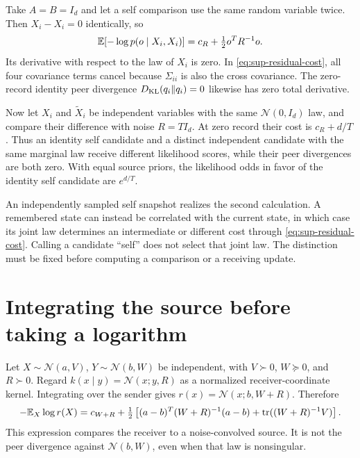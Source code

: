 Take $A=B=I_d$ and let a self comparison use the same random variable twice. Then $X_i-X_i=0$ identically, so
\begin{equation}
 \mathbb E[-\log p(o\mid X_i,X_i)]
 =c_R+\tfrac12o^TR^{-1}o.
 \label{eq:sup-self-cost}
\end{equation}
Its derivative with respect to the law of $X_i$ is zero. In \cref{eq:sup-residual-cost}, all four covariance terms cancel because $\Sigma_{ii}$ is also the cross covariance. The zero-record identity peer divergence $D_{\mathrm{KL}}(q_i\Vert q_i)=0$ likewise has zero total derivative.

Now let $X_i$ and $\widetilde X_i$ be independent variables with the same $\mathcal N(0,I_d)$ law, and compare their difference with noise $R=TI_d$. At zero record their cost is $c_R+d/T$. Thus an identity self candidate and a distinct independent candidate with the same marginal law receive different likelihood scores, while their peer divergences are both zero. With equal source priors, the likelihood odds in favor of the identity self candidate are $e^{d/T}$.

An independently sampled self snapshot realizes the second calculation. A remembered state can instead be correlated with the current state, in which case its joint law determines an intermediate or different cost through \cref{eq:sup-residual-cost}. Calling a candidate ``self'' does not select that joint law. The distinction must be fixed before computing a comparison or a receiving update.

\section{Integrating the source before taking a logarithm}

Let $X\sim\mathcal N(a,V)$, $Y\sim\mathcal N(b,W)$ be independent, with $V\succ0$, $W\succeq0$, and $R\succ0$. Regard $k(x\mid y)=\mathcal N(x;y,R)$ as a normalized receiver-coordinate kernel. Integrating over the sender gives $r(x)=\mathcal N(x;b,W+R)$. Therefore
\begin{equation}
 -\mathbb E_X\log r(X)
 =c_{W+R}+\tfrac12\left[(a-b)^T(W+R)^{-1}(a-b)
                       +\operatorname{tr}((W+R)^{-1}V)\right].
 \label{eq:sup-integrated-score}
\end{equation}
This expression compares the receiver to a noise-convolved source. It is not the peer divergence against $\mathcal N(b,W)$, even when that law is nonsingular.

